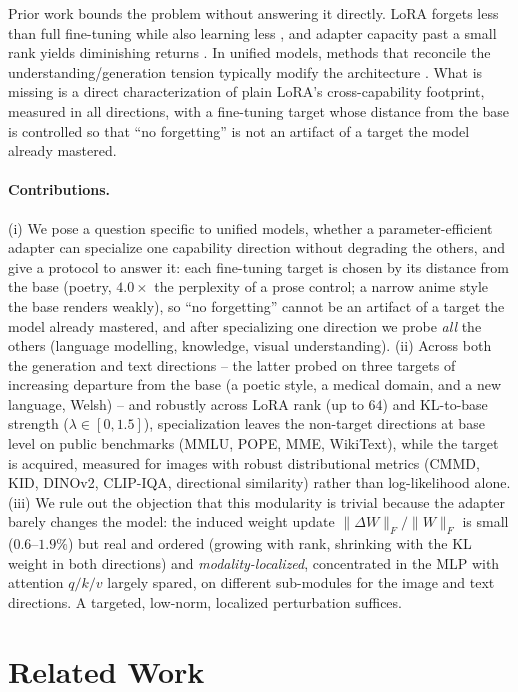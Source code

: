 \documentclass{article}
\begin{document}
Prior work bounds the problem without answering it directly. LoRA forgets less
than full fine-tuning while also learning less \citep{biderman2024lora}, and
adapter capacity past a small rank yields diminishing returns
\citep{zhang2024scalingmeetsfinetuning}. In unified models, methods that
reconcile the understanding/generation tension typically modify the architecture
\citep{dou2024loramoe}. What is missing is a direct characterization of plain
LoRA's cross-capability footprint, measured in all directions, with a fine-tuning
target whose distance from the base is controlled so that ``no forgetting'' is
not an artifact of a target the model already mastered.

\paragraph{Contributions.}
(i) We pose a question specific to unified models, whether a parameter-efficient
adapter can specialize one capability direction without degrading the others, and
give a protocol to answer it: each fine-tuning target is chosen by its distance
from the base (poetry, $4.0\times$ the perplexity of a prose control; a narrow
anime style the base renders weakly), so ``no forgetting'' cannot be an artifact of
a target the model already mastered, and after specializing one direction we probe
\emph{all} the others (language modelling, knowledge, visual understanding).
(ii) Across both the generation and text directions -- the latter probed on three
targets of increasing departure from the base (a poetic style, a medical domain,
and a new language, Welsh) -- and robustly across LoRA rank (up to $64$) and
KL-to-base strength ($\lambda\in[0,1.5]$), specialization leaves the non-target
directions at base level on public benchmarks (MMLU, POPE, MME, WikiText), while
the target is acquired, measured for images with robust distributional metrics
(CMMD, KID, DINOv2, CLIP-IQA, directional similarity) rather than log-likelihood
alone.
(iii) We rule out the objection that this modularity is trivial because the adapter
barely changes the model: the induced weight update
$\lVert\Delta W\rVert_F/\lVert W\rVert_F$ is small ($0.6$--$1.9\%$) but real and
ordered (growing with rank, shrinking with the KL weight in both directions) and
\emph{modality-localized}, concentrated in the MLP with attention $q/k/v$ largely
spared, on different sub-modules for the image and text directions. A targeted,
low-norm, localized perturbation suffices.

\section{Related Work}
\end{document}
